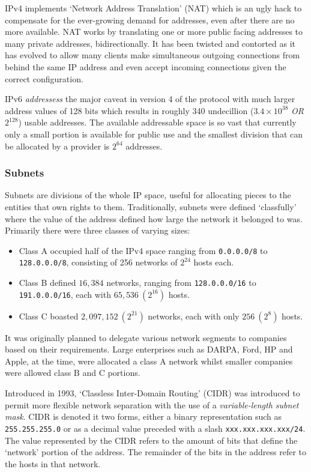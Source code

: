     IPv4 implements `Network Address Translation' (NAT) which is an ugly hack to compensate for the ever-growing demand for addresses, even after there are no more available. NAT works by translating one or more public facing addresses to many private addresses, bidirectionally. It has been twisted and contorted as it has evolved to allow many clients make simultaneous outgoing connections from behind the same IP address and even accept incoming connections given the correct configuration.

    IPv6 \textit{addressess} the major caveat in version 4 of the protocol with much larger address values of 128 bits which results in roughly 340 undecillion ($3.4 \times 10^{38}$ \textit{OR} $2^{128}$) usable addresses. The available addressable space is so vast that currently only a small portion is available for public use and the smallest division that can be allocated by a provider is $2^{64}$ addresses.

    \subsubsection{Subnets}
    Subnets are divisions of the whole IP space, useful for allocating pieces to the entities that own rights to them. Traditionally, subnets were defined `classfully' where the value of the address defined how large the network it belonged to was. Primarily there were three classes of varying sizes:
    \begin{itemize}
        \item{Class A occupied half of the IPv4 space ranging from \texttt{0.0.0.0/8} to \texttt{128.0.0.0/8}, consisting of 256 networks of $2^{24}$ hosts each.}
        \item{Class B defined $16,384$ networks, ranging from \texttt{128.0.0.0/16} to \texttt{191.0.0.0/16}, each with $65,536\ (2^{16})$ hosts.}
        \item{Class C boasted $2,097,152\ (2^{21})$ networks, each with only $256\ (2^{8})$ hosts.}
    \end{itemize}

    It was originally planned to delegate various network segments to companies based on their requirements. Large enterprises such as DARPA, Ford, HP and Apple, at the time, were allocated a class A network whilst smaller companies were allowed class B and C portions.

    Introduced in 1993, `Classless Inter-Domain Routing' (CIDR) was introduced to permit more flexible network separation with the use of a \textit{variable-length subnet mask}. CIDR is denoted it two forms, either a binary representation such as \texttt{255.255.255.0} or as a decimal value preceded with a slash \texttt{xxx.xxx.xxx.xxx/24}. The value represented by the CIDR refers to the amount of bits that define the `network' portion of the address. The remainder of the bits in the address refer to the hosts in that network.

